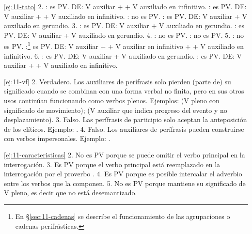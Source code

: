 \begin{solucion}{\ref{ej:11-tato}}
2. : es PV. DE: V auxiliar  +  + V
auxiliado  en infinitivo. : es PV. DE: V
auxiliar  +  + V auxiliado  en
infinitivo. : no es PV. : es PV. DE: V
auxiliar  + V auxiliado  en gerundio. 3.
: es PV. DE: V auxiliar  + V auxiliado
 en gerundio. : es PV. DE: V auxiliar
 + V auxiliado  en gerundio. 4. : no es PV. : no es PV. 5. : no es PV. :\footnote{En
§\ref{sec:11-cadenas} se describe el funcionamiento de las agrupaciones o
cadenas perifrásticas.} es PV. DE: V auxiliar  +  + V
auxiliar  en infinitivo +  + V auxiliado en
infinitivo. 6. : es PV. DE: V auxiliar  + V
auxiliado  en gerundio. : es PV. DE: V auxiliar
 +  + V auxiliado en infinitivo.
\end{solucion}

\begin{solucion}{\ref{ej:11-vf}}
2. Verdadero. Los auxiliares de perífrasis solo pierden (parte de) su significado
cuando se combinan con una forma verbal no finita, pero en sus otros usos
continúan funcionando como verbos plenos. Ejemplos:  (V pleno con significado de movimiento);  (V auxiliar que indica progreso del evento y no desplazamiento). 3.
Falso. Las perífrasis de participio solo aceptan la anteposición de los clíticos.
Ejemplo: . 4. Falso. Los auxiliares de perífrasis pueden construirse con
verbos impersonales. Ejemplo: .
\end{solucion}

\begin{solucion}{\ref{ej:11-caracteristicas}}
2. No es PV porque se puede omitir el verbo principal en la interrogación. 3. Es
PV porque el verbo principal está reemplazado en la interrogación por el proverbo
. 4. Es PV porque es posible intercalar el adverbio
 entre los verbos que la componen. 5. No es PV porque
 mantiene su significado de V pleno, es decir que no está
desemantizado.
\end{solucion}

